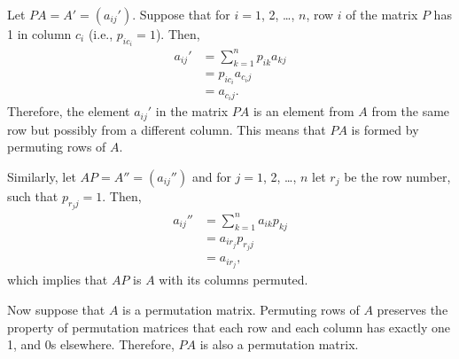 Let $PA=A'=(a_{ij}')$.
Suppose that for $i=1$, 2, \dots, $n$, row $i$ of the matrix $P$ has 1 in column $c_i$ (i.e., $p_{ic_i}=1$).
Then,
\begin{align*}
    a_{ij}' &= \sum_{k=1}^np_{ik}a_{kj} \\
    &= p_{ic_i}a_{c_ij} \\
    &= a_{c_ij}.
\end{align*}
Therefore, the element $a_{ij}'$ in the matrix $PA$ is an element from $A$ from the same row but possibly from a different column.
This means that $PA$ is formed by permuting rows of $A$.

Similarly, let $AP=A''=(a_{ij}'')$ and for $j=1$, 2, \dots, $n$ let $r_j$ be the row number, such that $p_{r_jj}=1$.
Then,
\begin{align*}
    a_{ij}'' &= \sum_{k=1}^na_{ik}p_{kj} \\
    &= a_{ir_j}p_{r_jj} \\
    &= a_{ir_j},
\end{align*}
which implies that $AP$ is $A$ with its columns permuted.

Now suppose that $A$ is a permutation matrix.
Permuting rows of $A$ preserves the property of permutation matrices that each row and each column has exactly one 1, and 0s elsewhere.
Therefore, $PA$ is also a permutation matrix.
